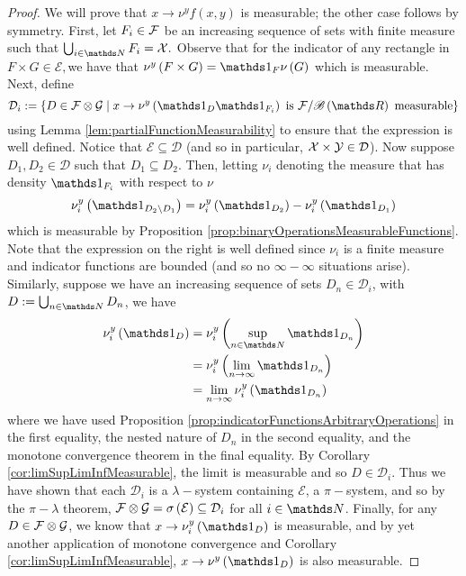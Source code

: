 \begin{proof}
We will prove that $x\to\nu^{y}f\left(x,y\right)$ is measurable;
the other case follows by symmetry. First, let $F_{i}\in\mathcal{\mathcal{F}}$
be an increasing sequence of sets with finite measure such that $\bigcup_{i\in\N}F_{i}=\mathcal{\X}.$
Observe that for the indicator of any rectangle in $F\times G\in\mathcal{E},$we
have that $\nu^{y}\left(F\times G\right)=\indicate_{F}\nu\left(G\right)$
which is measurable. Next, define
\[
\mathcal{D}_{i}:=\left\{ D\in\mathcal{F}\otimes\mathcal{G}\mid x\to\nu^{y}\left(\indicate_{D}\indicate_{F_{i}}\right)\text{ is }\mathcal{\F}/\borel\left(\R\right)\ \text{measurable}\right\} 
\]
using Lemma \ref{lem:partialFunctionMeasurability} to ensure that
the expression is well defined. Notice that $\mathcal{E}\subseteq\mathcal{D}$
(and so in particular, $\mathcal{X}\times\mathcal{Y}\in\mathcal{D}$). Now
suppose $D_{1},D_{2}\in\mathcal{D}$ such that $D_{1}\subseteq D_{2}$.
Then, letting $\nu_{i}$ denoting the measure that has density $\indicate_{F_{i}}$
with respect to $\nu$
\[
\nu_{i}^{y}\left(\indicate_{D_{2}\setminus D_{1}}\right)=\nu_{i}^{y}\left(\indicate_{D_{2}}\right)-\nu_{i}^{y}\left(\indicate_{D_{1}}\right)
\]
 which is measurable by Proposition \ref{prop:binaryOperationsMeasurableFunctions}.
Note that the expression on the right is well defined since $\nu_{i}$
is a finite measure and indicator functions are bounded (and so no
$\infty-\infty$ situations arise). Similarly, suppose we have an
increasing sequence of sets $D_{n}\in\mathcal{D}_{i}$, with $D:=\bigcup_{n\in\N}D_{n}$,
we have 
\begin{align*}
\nu_{i}^{y}\left(\indicate_{D}\right) & =\nu_{i}^{y}\left(\sup_{n\in\N}\indicate_{D_{n}}\right)\\
 & =\nu_{i}^{y}\left(\lim_{n\to\infty}\indicate_{D_{n}}\right)\\
 & =\lim_{n\to\infty}\nu_{i}^{y}\left(\indicate_{D_{n}}\right)
\end{align*}
where we have used Proposition \ref{prop:indicatorFunctionsArbitraryOperations}
in the first equality, the nested nature of $D_{n}$ in the second
equality, and the monotone convergence theorem in the final equality.
By Corollary \ref{cor:limSupLimInfMeasurable}, the limit is measurable
and so $D\in\mathcal{D}_{i}$. Thus we have shown that each $\mathcal{D}_{i}$
is a $\lambda-$system containing $\mathcal{E}$, a $\pi-$system,
and so by the $\pi-\lambda$ theorem, $\mathcal{F}\otimes\mathcal{G}=\sigma\left(\mathcal{E}\right)\subseteq\mathcal{D}_{i}$
for all $i\in\N$. Finally, for any $D\in\mathcal{F}\otimes\mathcal{G}$, we
know that $x\to\nu_{i}^{y}\left(\indicate_{D}\right)$ is measurable,
and by yet another application of monotone convergence and Corollary
\ref{cor:limSupLimInfMeasurable}, $x\to\nu^{y}\left(\indicate_{D}\right)$
is also measurable.


\end{proof}
